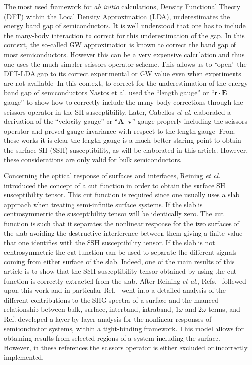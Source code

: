 \documentclass[floatfix,prb,aps,superscriptaddress,showpacs,letterpaper]{revtex4}
\begin{document}
The most used framework for \textit{ab initio} calculations, Density 
Functional Theory (DFT) within the Local Density Approximation (LDA),
\cite{kohnPR65} underestimates the energy band gap of semiconductors. It is 
well understood that one has to include the many-body interaction to correct 
for this underestimation of the gap. In this context, the so-called GW 
approximation\cite{onidaRMP02} is known to correct the band gap of most 
semiconductors\cite{luceroJPCM12}. However this can be a very expensive
calculation and thus one uses the much simpler scissors operator scheme.
\cite{levinePRL89,levinePRL91,delsolePRB93}  
This allows us to ``open'' the DFT-LDA gap to 
its correct experimental or GW value even when experiments are not available. 
In this context, to correct for the underestimation of the energy band gap of 
semiconductors Nastos et al.\cite{nastosPRB05} used the ``length gauge'' or 
``$\mathbf{r}\cdot\mathbf{E}$ gauge'' to show how to correctly include the 
many-body corrections through the scissors operator in the SH susceptibility.
Later, Cabellos \textit{et al}.\cite{cabellosPRB09} elaborated a derivation 
of the ``velocity gauge'' or ``$\mathbf{A}\cdot\mathbf{v}$'' gauge properly including the 
scissors operator and proved gauge invariance with respect to the length 
gauge. From these works it is clear the length gauge is a much better staring
point to obtain the surface SH (SSH) susceptibility, as will be elaborated 
in this article. However, these considerations are only valid for bulk 
semiconductors.

Concerning the optical response of surfaces and interfaces, Reining 
\textit{et al.}\cite{reiningPRB94} introduced the concept of a cut function 
in order to obtain the surface SH susceptibility tensor. This cut function 
is required since one usually uses a slab approach when treating semi-infinite 
surface systems. If the slab is centrosymmetric the susceptibility tensor will 
be identically zero. The cut function is such that it separates the nonlinear 
response for the two surfaces of the slab avoiding the destructive 
interference between them giving a finite value that one identifies with the 
SSH susceptibility tensor. If the slab is not centrosymmetric the cut function 
can be used to separate the different signals coming from either surface of 
the slab. Indeed, one of the main results of this article is to show that the 
SSH  susceptibility tensor obtained by using the cut function is correctly 
extracted from the slab. After Reining \textit{et al.},\cite{reiningPRB94}
Refs.~
followed 
upon this work and in particular Ref.~ went into a 
detailed analysis of the different contributions to the SHG spectra of a 
surface and the nuanced relationship between bulk, surface, interband, 
intraband, $1\omega$ and $2\omega$ terms, and
Ref.  developed a layer-by-layer 
analysis for the nonlinear responses of semiconductor systems, within a 
tight-binding framework. This model allows for obtaining results from 
selected regions of a system including the surface. However, in these 
references the scissors operator is either excluded or incorrectly 
implemented.
\end{document}
